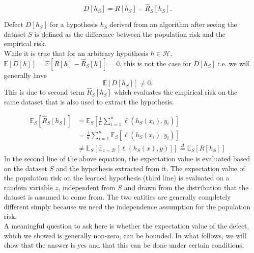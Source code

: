 \documentclass{article}
\begin{document}





 
\begin{defn}[Defect]\label{defect}
\[
	D[h_S] = R[h_{S}] - \hat{R}_{S}[h_S].
\]
\end{defn}
Defect $D[h_S]$ for a hypothesis $h_S$ derived from an algorithm after seeing the dataset $S$ is defined as  the difference between the population risk and the empirical risk. \\

While it is true that 
for an arbitrary hypothesis $h \in \mathcal{H}$,\;\;\; 
	$\mathbb{E}[{D}[h]]=\mathbb{E}[R[h] - \hat{R}_S[h]]=0$,
this is not the case for $D[h_S]$ i.e. we will generally have   
\[
	\mathbb{E}[D[h_S]] \neq 0.
\]
This is due to second term $\hat{R}_{S}[h_S]$ which evaluates the empirical risk on the same  dataset that is also used to extract the hypothesis. 

\begin{align*}
    \mathbb{E}_S[\hat{R}_{S}[h_S]]
    &=\mathbb{E}_S[\frac{1}{n}\sum_{i=1}^n \ell(h_S(x_{i}),y_{i})]\\
    &=\frac{1}{n}\sum_{i=1}^n\mathbb{E}_S[ \ell(h_S(x_{i}),y_{i})]\\
    &\neq \mathbb{E}_S[\mathbb{E}_{z \sim \mathcal{D}} \left[\ell(h_S(x),y)\right]]\overset{\Delta}{=}\mathbb{E}_S[{R}[h_S]]
\end{align*}
In the second line of the above equation, the expectation value is evaluated based on the dataset $S$ and the hypothesis extracted from it.  
The expectation value of the population risk on the learned hypothesis (third line) is evaluated on a random variable $z$, independent from $S$ and drawn from the distribution that the dataset is assumed to come from. 
The two entities are generally completely different simply because we need the independence assumption for the population risk.\\ 

A meaningful question to ask here is whether the expectation value of the defect, which we showed is generally non-zero, can be bounded. In what follows, we will show that the answer is yes and that this can be done under certain conditions.  
  	
\end{document}
